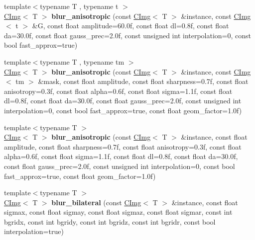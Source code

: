 \begin{DoxyCompactItemize}
\item 
\hypertarget{namespacecimg__library_a1982a130768515644d2a2dccb1a2faea}{{\footnotesize template$<$typename T , typename t $>$ }\\\hyperlink{structcimg__library_1_1_c_img}{C\-Img}$<$ T $>$ {\bfseries blur\-\_\-anisotropic} (const \hyperlink{structcimg__library_1_1_c_img}{C\-Img}$<$ T $>$ \&instance, const \hyperlink{structcimg__library_1_1_c_img}{C\-Img}$<$ t $>$ \&G, const float amplitude=60.\-0f, const float dl=0.\-8f, const float da=30.\-0f, const float gauss\-\_\-prec=2.\-0f, const unsigned int interpolation=0, const bool fast\-\_\-approx=true)}\label{namespacecimg__library_a1982a130768515644d2a2dccb1a2faea}

\item 
\hypertarget{namespacecimg__library_a77b7df743f2fafedffd8e903387f1d6d}{{\footnotesize template$<$typename T , typename tm $>$ }\\\hyperlink{structcimg__library_1_1_c_img}{C\-Img}$<$ T $>$ {\bfseries blur\-\_\-anisotropic} (const \hyperlink{structcimg__library_1_1_c_img}{C\-Img}$<$ T $>$ \&instance, const \hyperlink{structcimg__library_1_1_c_img}{C\-Img}$<$ tm $>$ \&mask, const float amplitude, const float sharpness=0.\-7f, const float anisotropy=0.\-3f, const float alpha=0.\-6f, const float sigma=1.\-1f, const float dl=0.\-8f, const float da=30.\-0f, const float gauss\-\_\-prec=2.\-0f, const unsigned int interpolation=0, const bool fast\-\_\-approx=true, const float geom\-\_\-factor=1.\-0f)}\label{namespacecimg__library_a77b7df743f2fafedffd8e903387f1d6d}

\item 
\hypertarget{namespacecimg__library_a14d7a7e95627bd3bac5fcf218c456725}{{\footnotesize template$<$typename T $>$ }\\\hyperlink{structcimg__library_1_1_c_img}{C\-Img}$<$ T $>$ {\bfseries blur\-\_\-anisotropic} (const \hyperlink{structcimg__library_1_1_c_img}{C\-Img}$<$ T $>$ \&instance, const float amplitude, const float sharpness=0.\-7f, const float anisotropy=0.\-3f, const float alpha=0.\-6f, const float sigma=1.\-1f, const float dl=0.\-8f, const float da=30.\-0f, const float gauss\-\_\-prec=2.\-0f, const unsigned int interpolation=0, const bool fast\-\_\-approx=true, const float geom\-\_\-factor=1.\-0f)}\label{namespacecimg__library_a14d7a7e95627bd3bac5fcf218c456725}

\item 
\hypertarget{namespacecimg__library_a31cdc922a23a961fdc1da6fa179dcf1f}{{\footnotesize template$<$typename T $>$ }\\\hyperlink{structcimg__library_1_1_c_img}{C\-Img}$<$ T $>$ {\bfseries blur\-\_\-bilateral} (const \hyperlink{structcimg__library_1_1_c_img}{C\-Img}$<$ T $>$ \&instance, const float sigmax, const float sigmay, const float sigmaz, const float sigmar, const int bgridx, const int bgridy, const int bgridz, const int bgridr, const bool interpolation=true)}\label{namespacecimg__library_a31cdc922a23a961fdc1da6fa179dcf1f}


\end{DoxyCompactItemize}
